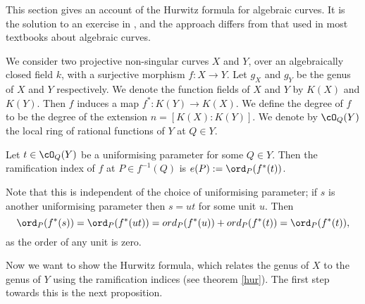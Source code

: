 This section gives an account of the Hurwitz formula for algebraic curves. It is the solution to an exercise in \cite[pg. 110]{fulton}, and the approach differs from that used in most textbooks about algebraic curves.

We consider two projective non-singular curves $X$ and $Y$, over an algebraically closed field $k$, with a surjective morphism $f:X\rightarrow Y$.
Let $g_X$ and $g_Y$ be the genus of $X$ and $Y$ respectively. 
We denote the function fields of $X$ and $Y$ by $K(X)$ and $K(Y)$.
Then $f$ induces a map $ f^*:K(Y)\rightarrow K(X)$.
We define the degree of $f$ to be the degree of the extension $n = [K(X):K(Y)]$. 
We denote by $\cO_Q(Y)$ the local ring of rational functions of $Y$ at $Q\in Y$.\\


\begin{defn}
	Let $t\in \cO_{Q}(Y)$ be a uniformising parameter for some $Q\in Y$.
	Then the ramification index of $f$ at $P\in f^{-1}(Q)$ is $e(P):= \ord_{P}(f^* (t))$.
\end{defn}

Note that this is independent of the choice of uniformising parameter; if $s$ is another uniformising parameter then $s=ut$ for some unit $u$. 
Then 
\[
\ord_{P}(f^*(s))=\ord_{P}(f^*(ut))=ord_{P}(f^*(u))+ord_{P}(f^*(t))=\ord_{P}(f^*(t)),
\]
as the order of any unit is zero.

Now we want to show the Hurwitz formula, which relates the genus of $X$ to the genus of $Y$ using the ramification indices (see theorem \ref{hur}).
The first step towards this is the next proposition.\\


